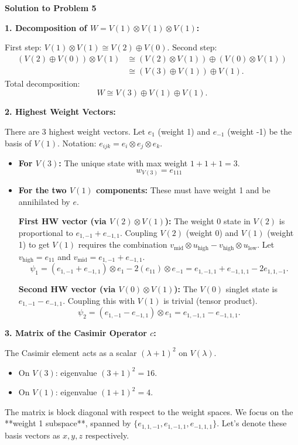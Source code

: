 \documentclass{article}
\begin{document}
\hrulefill

\textbf{Solution to Problem 5}

\textbf{1. Decomposition of $W = V(1) \otimes V(1) \otimes V(1)$:}

First step: $V(1) \otimes V(1) \cong V(2) \oplus V(0)$.
Second step:
\begin{align*}
    (V(2) \oplus V(0)) \otimes V(1) &\cong (V(2) \otimes V(1)) \oplus (V(0) \otimes V(1)) \\
    &\cong (V(3) \oplus V(1)) \oplus V(1).
\end{align*}
Total decomposition:
\[ W \cong V(3) \oplus V(1) \oplus V(1). \]

\vspace{0.5cm}

\textbf{2. Highest Weight Vectors:}

There are 3 highest weight vectors. Let $e_1$ (weight 1) and $e_{-1}$ (weight -1) be the basis of $V(1)$. Notation: $e_{ijk} = e_i \otimes e_j \otimes e_k$.

\begin{itemize}
    \item \textbf{For $V(3)$:} The unique state with max weight $1+1+1=3$.
    \[ w_{V(3)} = e_{111} \]
    
    \item \textbf{For the two $V(1)$ components:} These must have weight 1 and be annihilated by $e$.
    
    \textbf{First HW vector (via $V(2) \otimes V(1)$):}
    The weight 0 state in $V(2)$ is proportional to $e_{1,-1} + e_{-1,1}$.
    Coupling $V(2)$ (weight 0) and $V(1)$ (weight 1) to get $V(1)$ requires the combination $v_{\text{mid}} \otimes u_{\text{high}} - v_{\text{high}} \otimes u_{\text{low}}$.
    Let $v_{\text{high}} = e_{11}$ and $v_{\text{mid}} = e_{1,-1} + e_{-1,1}$.
    \[ \psi_1 = (e_{1,-1} + e_{-1,1}) \otimes e_1 - 2(e_{11}) \otimes e_{-1} = e_{1,-1,1} + e_{-1,1,1} - 2e_{1,1,-1}. \]
    
    \textbf{Second HW vector (via $V(0) \otimes V(1)$):}
    The $V(0)$ singlet state is $e_{1,-1} - e_{-1,1}$. Coupling this with $V(1)$ is trivial (tensor product).
    \[ \psi_2 = (e_{1,-1} - e_{-1,1}) \otimes e_1 = e_{1,-1,1} - e_{-1,1,1}. \]
\end{itemize}

\vspace{0.5cm}

\textbf{3. Matrix of the Casimir Operator $c$:}

The Casimir element acts as a scalar $(\lambda+1)^2$ on $V(\lambda)$.
\begin{itemize}
    \item On $V(3)$: eigenvalue $(3+1)^2 = 16$.
    \item On $V(1)$: eigenvalue $(1+1)^2 = 4$.
\end{itemize}
The matrix is block diagonal with respect to the weight spaces. We focus on the **weight 1 subspace**, spanned by $\{ e_{1,1,-1}, e_{1,-1,1}, e_{-1,1,1} \}$. Let's denote these basis vectors as $x, y, z$ respectively.
\end{document}
